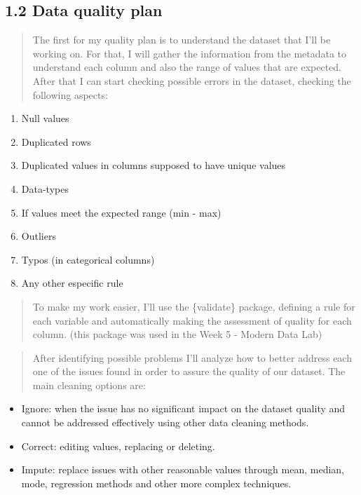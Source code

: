 \documentclass[
]{article}
\providecommand{\tightlist}{%
  \setlength{\itemsep}{0pt}\setlength{\parskip}{0pt}}
\begin{document}
\subsection{1.2 Data quality plan}\label{data-quality-plan}

\begin{quote}
The first for my quality plan is to understand the dataset that I'll be
working on. For that, I will gather the information from the metadata to
understand each column and also the range of values that are expected.
After that I can start checking possible errors in the dataset, checking
the following aspects:
\end{quote}

\begin{enumerate}
\def\labelenumi{\arabic{enumi}.}
\tightlist
\item
  Null values
\item
  Duplicated rows
\item
  Duplicated values in columns supposed to have unique values
\item
  Data-types
\item
  If values meet the expected range (min - max)
\item
  Outliers
\item
  Typos (in categorical columns)
\item
  Any other especific rule
\end{enumerate}

\begin{quote}
To make my work easier, I'll use the \{validate\} package, defining a
rule for each variable and automatically making the assessment of
quality for each column. (this package was used in the Week 5 - Modern
Data Lab)
\end{quote}

\begin{quote}
After identifying possible problems I'll analyze how to better address
each one of the issues found in order to assure the quality of our
dataset. The main cleaning options are:
\end{quote}

\begin{itemize}
\item
  Ignore: when the issue has no significant impact on the dataset
  quality and cannot be addressed effectively using other data cleaning
  methods.
\item
  Correct: editing values, replacing or deleting.
\item
  Impute: replace issues with other reasonable values through mean,
  median, mode, regression methods and other more complex techniques.
\end{itemize}
\end{document}
